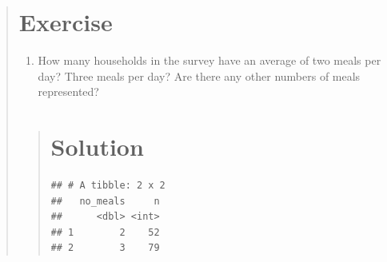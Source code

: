 \documentclass[]{book}
\newenvironment{Shaded}{\begin{snugshade}}{\end{snugshade}}
\newcommand{\KeywordTok}[1]{\textcolor[rgb]{0.13,0.29,0.53}{\textbf{#1}}}
\newcommand{\StringTok}[1]{\textcolor[rgb]{0.31,0.60,0.02}{#1}}
\newcommand{\OperatorTok}[1]{\textcolor[rgb]{0.81,0.36,0.00}{\textbf{#1}}}
\newcommand{\NormalTok}[1]{#1}
\providecommand{\tightlist}{%
  \setlength{\itemsep}{0pt}\setlength{\parskip}{0pt}}
\begin{document}
\begin{quote}
\section{Exercise}\label{exercise-7}

\begin{enumerate}
\def\labelenumi{\arabic{enumi}.}
\tightlist
\item
  How many households in the survey have an average of two meals per
  day? Three meals per day? Are there any other numbers of meals
  represented?
\end{enumerate}

\begin{quote}
\section{Solution}\label{solution-6}

\begin{Shaded}
\end{Shaded}

\begin{verbatim}
## # A tibble: 2 x 2
##   no_meals     n
##      <dbl> <int>
## 1        2    52
## 2        3    79
\end{verbatim}
\end{quote}
\end{quote}
\end{document}
